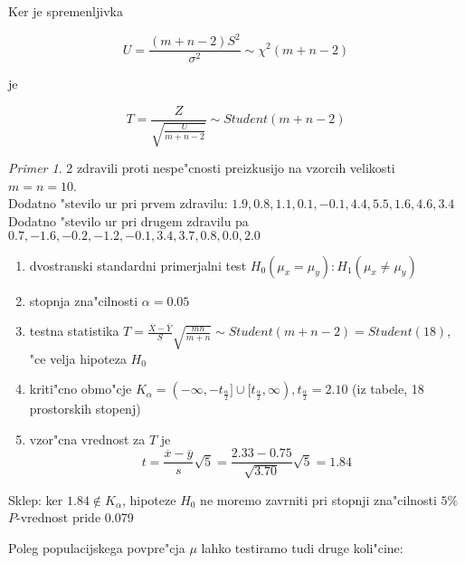 \documentclass[a4paper,12pt]{article}
\theoremstyle{definition}
\theoremstyle{remark}
\newtheorem*{ex}{Primer}
\begin{document}
Ker je spremenljivka

\begin{equation*}
    U = \frac{(m+n-2) S^2}{\sigma^2} \sim \chi^2(m+n-2)
\end{equation*}

je

\begin{equation*}
    T = \frac{Z}{\sqrt{\frac{U}{m+n-2}}} \sim Student(m+n-2)
\end{equation*}




\begin{ex}
    2 zdravili proti nespe"cnosti preizkusijo na vzorcih velikosti $m=n=10$. \\
    Dodatno "stevilo ur pri prvem zdravilu: $1.9, 0.8, 1.1, 0.1, -0.1, 4.4, 5.5, 1.6, 4.6, 3.4$ \\
    Dodatno "stevilo ur pri drugem zdravilu pa $0.7, -1.6, -0.2, -1.2, -0.1, 3.4, 3.7, 0.8, 0.0, 2.0$

    \begin{enumerate}
        \item dvostranski standardni primerjalni test $H_0(\mu_x = \mu_y) : H_1(\mu_x \neq \mu_y)$
        \item stopnja zna"cilnosti $\alpha = 0.05$
        \item testna statistika $T = \frac{\overline{X} - \overline{Y}}{S} \sqrt{\frac{mn}{m+n}} \sim Student(m+n-2)
            = Student(18)$, "ce velja hipoteza $H_0$
        \item kriti"cno obmo"cje $K_{\alpha} = (-\infty, -t_{\frac{\alpha}{2}}] \cup [t_{\frac{\alpha}{2}}, \infty),
            t_{\frac{\alpha}{2}} = 2.10$ (iz tabele, 18 prostorskih stopenj)
        \item vzor"cna vrednost za $T$ je 
            \begin{equation*}
                t = \frac{\overline{x} - \overline{y}}{s} \sqrt{5} = \frac{2.33 - 0.75}{\sqrt{3.70}} \sqrt{5} = 1.84
            \end{equation*}
    \end{enumerate}

    Sklep: ker $1.84 \notin K_{\alpha}$, hipoteze $H_0$ ne moremo zavrniti pri stopnji zna"cilnosti $5\%$ \\
    $P$-vrednost pride 0.079
\end{ex}

Poleg populacijskega povpre"cja $\mu$ lahko testiramo tudi druge koli"cine:
\end{document}

